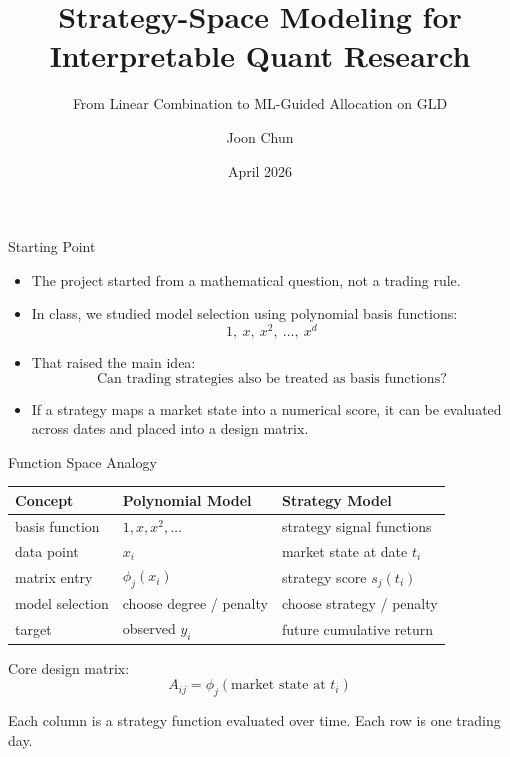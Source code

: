 \documentclass[aspectratio=169]{beamer}
\title{Strategy-Space Modeling for Interpretable Quant Research}
\subtitle{From Linear Combination to ML-Guided Allocation on GLD}
\author{Joon Chun}
\date{April 2026}
\begin{document}
\begin{frame}
  \titlepage
\end{frame}

\begin{frame}{Starting Point}
  \begin{itemize}
    \item The project started from a mathematical question, not a trading rule.
    \item In class, we studied model selection using polynomial basis functions:
    \[
      1,\ x,\ x^2,\ \dots,\ x^d
    \]
    \item That raised the main idea:
    \[
      \text{Can trading strategies also be treated as basis functions?}
    \]
    \item If a strategy maps a market state into a numerical score,
          it can be evaluated across dates and placed into a design matrix.
  \end{itemize}
\end{frame}

\begin{frame}{Function Space Analogy}
  \small
  \begin{tabular}{lll}
    \toprule
    Concept & Polynomial Model & Strategy Model \\
    \midrule
    basis function  & \(1, x, x^2, \dots\)   & strategy signal functions \\
    data point      & \(x_i\)                 & market state at date \(t_i\) \\
    matrix entry    & \(\phi_j(x_i)\)         & strategy score \(s_j(t_i)\) \\
    model selection & choose degree / penalty & choose strategy / penalty \\
    target          & observed \(y_i\)        & future cumulative return \\
    \bottomrule
  \end{tabular}

  \vspace{0.8em}
  Core design matrix:
  \[
    A_{ij} = \phi_j(\text{market state at } t_i)
  \]

  \vspace{0.4em}
  Each column is a strategy function evaluated over time.
  Each row is one trading day.
\end{frame}
\end{document}
